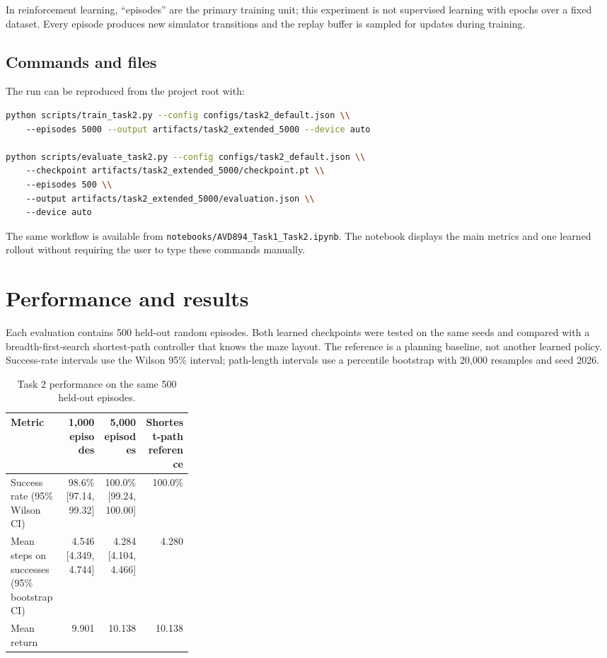 \documentclass[11pt,a4paper]{article}
\begin{document}
In reinforcement learning, ``episodes'' are the primary training unit; this
experiment is not supervised learning with epochs over a fixed dataset. Every
episode produces new simulator transitions and the replay buffer is sampled for
updates during training.

\subsection{Commands and files}

The run can be reproduced from the project root with:
\begin{lstlisting}[language=bash]
python scripts/train_task2.py --config configs/task2_default.json \\
    --episodes 5000 --output artifacts/task2_extended_5000 --device auto

python scripts/evaluate_task2.py --config configs/task2_default.json \\
    --checkpoint artifacts/task2_extended_5000/checkpoint.pt \\
    --episodes 500 \\
    --output artifacts/task2_extended_5000/evaluation.json \\
    --device auto
\end{lstlisting}

The same workflow is available from
\texttt{notebooks/AVD894\_Task1\_Task2.ipynb}. The notebook displays the main
metrics and one learned rollout without requiring the user to type these
commands manually.

\section{Performance and results}

Each evaluation contains 500 held-out random episodes. Both learned checkpoints
were tested on the same seeds and compared with a breadth-first-search
shortest-path controller that knows the maze layout. The reference is a planning
baseline, not another learned policy. Success-rate intervals use the Wilson
95\% interval; path-length intervals use a percentile bootstrap with 20,000
resamples and seed 2026.

\begin{table}[ht]
\centering
\caption{Task 2 performance on the same 500 held-out episodes.}
\scriptsize
\begin{tabular}{p{0.30\linewidth}rrr}
\toprule
Metric & 1,000 episodes & 5,000 episodes & Shortest-path reference\\
\midrule
Success rate (95\% Wilson CI) & 98.6\% [97.14, 99.32] & 100.0\% [99.24, 100.00] & 100.0\%\\
Mean steps on successes (95\% bootstrap CI) & 4.546 [4.349, 4.744] & 4.284 [4.104, 4.466] & 4.280\\
Mean return & 9.901 & 10.138 & 10.138\\
\bottomrule
\end{tabular}
\end{table}
\end{document}
